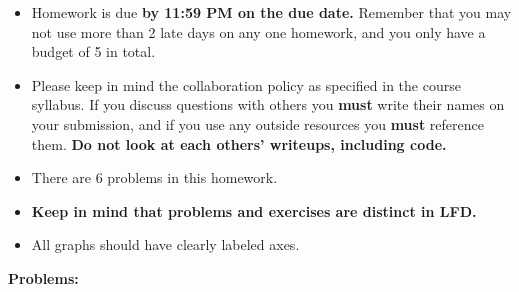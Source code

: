 \documentclass[11pt]{article}
\begin{document}
\begin{itemize}
\item Homework is due \textbf{by 11:59 PM on the due date.} Remember that
  you may not use more than 2 late days on any one homework, and you
  only have a budget of 5 in total.

\item Please keep in mind the collaboration policy as specified in the
  course syllabus. If you discuss questions with 
others you \textbf{must} write their names on your submission, and if
you use any outside resources you \textbf{must} reference
them. \textbf{Do not look at each others' writeups, including code.}

\item There are 6 problems in this homework. 
 \item \textbf{Keep in mind that problems and exercises are distinct
  in LFD.}

\item All graphs should have clearly labeled axes. 
\end{itemize}

\newpage 

\noindent \textbf{Problems:}
\end{document}
